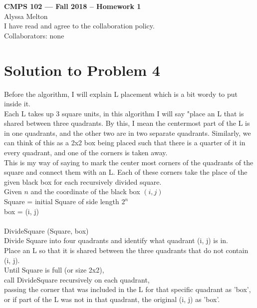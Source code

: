 \documentclass[11pt]{article}
\begin{document}
	
	\begin{center}
		{\bf\Large CMPS 102 --- Fall 2018 --  Homework 1}\\
		Alyssa Melton\\
		I have read and agree to the collaboration policy. \\
		Collaborators: none\\
	\end{center}
	
	
	\section*{Solution to Problem 4}
	
	Before the algorithm, I will explain L placement which is a bit wordy to put inside it. \\
	Each L takes up 3 square units, in this algorithm I will say "place an L that is shared between three quadrants. By this, I mean the centermost part of the L is in one quadrants, and the other two are in two separate quadrants. Similarly, we can think of this as a 2x2 box being placed such that there is a quarter of it in every quadrant, and one of the corners is taken away.\\ This is my way of saying to mark the center most corners of the quadrants of the square and connect them with an L. Each of these corners take the place of the given black box for each recursively divided square.
	\medskip
	\medskip
	\\
	Given $n$ and the coordinate of the black box $(i, j)$\\
	Square = initial Square of side length $2^n$\\
	box = (i, j)\\
	\\
	DivideSquare (Square, box)\\
	\indent Divide Square into four quadrants and identify what quadrant (i, j) is in.\\
	\indent Place an L so that it is shared between the three quadrants that do not contain (i, j).\\
	\indent Until Square is full (or size 2x2), \\
	\indent \indent call DivideSquare recursively on each quadrant, \\
	\indent \indent  passing the corner that was included in the L for that specific quadrant as 'box', \\
	\indent \indent or if part of the L was not in that quadrant, the original (i, j) as 'box'.\\
\end{document}
